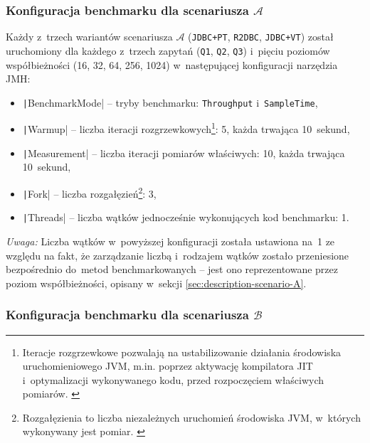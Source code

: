 \subsubsection{Konfiguracja benchmarku dla scenariusza \ensuremath{\mathcal{A}}}

Każdy z~trzech wariantów scenariusza $\mathcal{A}$ (\texttt{JDBC+PT}, \texttt{R2DBC}, \texttt{JDBC+VT}) został uruchomiony dla każdego z~trzech zapytań (\texttt{Q1}, \texttt{Q2}, \texttt{Q3}) i~pięciu poziomów współbieżności (16, 32, 64, 256, 1024) w~następującej konfiguracji narzędzia JMH:
\begin{itemize}
    \item \texttt|BenchmarkMode| -- tryby benchmarku: \texttt{Throughput} i~\texttt{SampleTime},
    \item \texttt|Warmup| -- liczba iteracji rozgrzewkowych\footnote{Iteracje rozgrzewkowe pozwalają na ustabilizowanie działania środowiska uruchomieniowego JVM, m.in. poprzez aktywację kompilatora JIT i~optymalizacji wykonywanego kodu, przed rozpoczęciem właściwych pomiarów. \cite{jmh-documentation}}: 5, każda trwająca 10~sekund,
    \item \texttt|Measurement| -- liczba iteracji pomiarów właściwych: 10, każda trwająca 10~sekund,
    \item \texttt|Fork| -- liczba rozgałęzień\footnote{Rozgałęzienia to liczba niezależnych uruchomień środowiska JVM, w~których wykonywany jest pomiar. \cite{jmh-documentation}}: 3,
    \item \texttt|Threads| -- liczba wątków jednocześnie wykonujących kod benchmarku: 1.
\end{itemize}
\textit{Uwaga:} Liczba wątków w~powyższej konfiguracji została ustawiona na~1 ze względu na fakt, że zarządzanie liczbą i~rodzajem wątków zostało przeniesione bezpośrednio do~metod benchmarkowanych -- jest ono reprezentowane przez poziom współbieżności, opisany w~sekcji \ref{sec:description-scenario-A}.

\newpage
\subsubsection{Konfiguracja benchmarku dla scenariusza \ensuremath{\mathcal{B}}}

